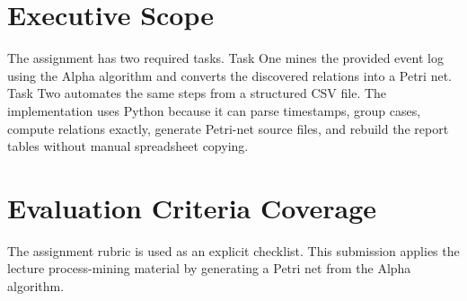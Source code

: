 \documentclass[11pt,a4paper]{article}
\begin{document}
\makecover
\makefrontmatter

\section{Executive Scope}
The assignment has two required tasks. Task One mines the provided event log using the Alpha algorithm and converts the discovered relations into a Petri net. Task Two automates the same steps from a structured CSV file. The implementation uses Python because it can parse timestamps, group cases, compute relations exactly, generate Petri-net source files, and rebuild the report tables without manual spreadsheet copying.

\section{Evaluation Criteria Coverage}
The assignment rubric is used as an explicit checklist. This submission applies the lecture process-mining material by generating a Petri net from the Alpha algorithm.
\end{document}
